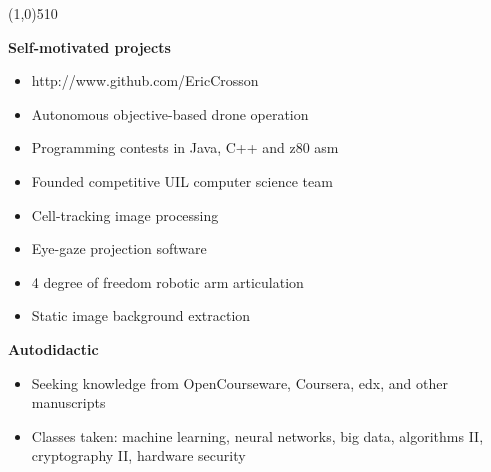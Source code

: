 \documentclass{report}
\newcommand{\cut}{\begin{center} \line(1,0){510} \end{center}}
\begin{document}
\cut{}

\textbf{Self-motivated projects}
\begin{paracol}{2}

  \begin{itemize}[label=$\circ$]
  \item http://www.github.com/EricCrosson
  \item Autonomous objective-based drone operation
  \item Programming contests in Java, C++ and z80 asm
  \item Founded competitive UIL computer science team
  \end{itemize}

  \switchcolumn{}
  \begin{itemize}[label=$\circ$]
  \item Cell-tracking image processing
  \item Eye-gaze projection software
  \item 4 degree of freedom robotic arm articulation
  \item Static image background extraction
  \end{itemize}
\end{paracol}

\textbf{Autodidactic}
\begin{itemize}[label=$\circ$]
\item Seeking knowledge from OpenCourseware, Coursera, edx, and other manuscripts
\item Classes taken: machine learning, neural networks, big data, algorithms II,
  cryptography II, hardware security
\end{itemize}


\end{document}
